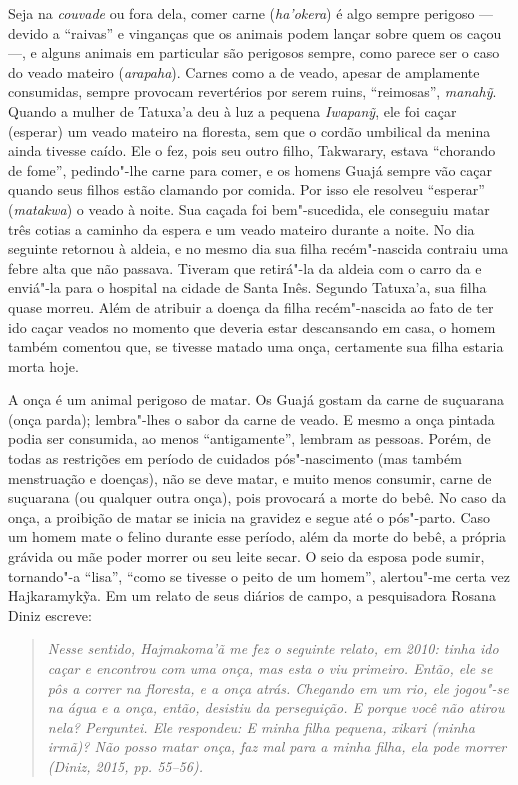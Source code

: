 Seja na \emph{couvade} ou fora dela, comer carne (\emph{ha'okera}) é
algo sempre perigoso --- devido a ``raivas'' e vinganças que os animais
podem lançar sobre quem os caçou ---, e alguns animais em particular são
perigosos sempre, como parece ser o caso do veado mateiro
(\emph{arapaha}). Carnes como a de veado, apesar de amplamente
consumidas, sempre provocam revertérios por serem ruins, ``reimosas'',
\emph{manahỹ}. Quando a mulher de Tatuxa'a deu à luz a pequena
\emph{Iwapanỹ}, ele foi caçar (esperar) um veado mateiro na floresta,
sem que o cordão umbilical da menina ainda tivesse caído. Ele o fez,
pois seu outro filho, Takwarary, estava ``chorando de fome'', pedindo"-lhe
carne para comer, e os homens Guajá sempre vão caçar quando seus filhos
estão clamando por comida. Por isso ele resolveu ``esperar''
(\emph{matakwa}) o veado à noite. Sua caçada foi bem"-sucedida, ele
conseguiu matar três cotias a caminho da espera e um veado mateiro
durante a noite. No dia seguinte retornou à aldeia, e no mesmo dia sua
filha recém"-nascida contraiu uma febre alta que não passava. Tiveram que
retirá"-la da aldeia com o carro da  e enviá"-la para o hospital na
cidade de Santa Inês. Segundo Tatuxa'a, sua filha quase morreu. Além de
atribuir a doença da filha recém"-nascida ao fato de ter ido caçar veados
no momento que deveria estar descansando em casa, o homem também
comentou que, se tivesse matado uma onça, certamente sua filha estaria
morta hoje.

A onça é um animal perigoso de matar. Os Guajá gostam da carne de
suçuarana (onça parda); lembra"-lhes o sabor da carne de veado. E mesmo a
onça pintada podia ser consumida, ao menos ``antigamente'', lembram as
pessoas. Porém, de todas as restrições em período de cuidados
pós"-nascimento (mas também menstruação e doenças), não se deve matar, e
muito menos consumir, carne de suçuarana (ou qualquer outra onça), pois
provocará a morte do bebê. No caso da onça, a proibição de matar se
inicia na gravidez e segue até o pós"-parto. Caso um homem mate o felino
durante esse período, além da morte do bebê, a própria grávida ou mãe
poder morrer ou seu leite secar. O seio da esposa pode sumir, tornando"-a
``lisa'', ``como se tivesse o peito de um homem'', alertou"-me certa vez
Hajkaramykỹa. Em um relato de seus diários de campo, a pesquisadora Rosana Diniz escreve:

\begin{quote}
\emph{Nesse sentido, Hajmakoma'ã me fez o seguinte relato, em 2010: tinha ido
caçar e encontrou com uma onça, mas esta o viu primeiro. Então, ele se
pôs a correr na floresta, e a onça atrás. Chegando em um rio, ele
jogou"-se na água e a onça, então, desistiu da perseguição. E porque você
não atirou nela? Perguntei. Ele respondeu: E minha filha pequena,
\emph{xikari} (minha irmã)? Não posso matar onça, faz mal para a minha
filha, ela pode morrer (Diniz, 2015, pp. 55--56).}
\end{quote}

